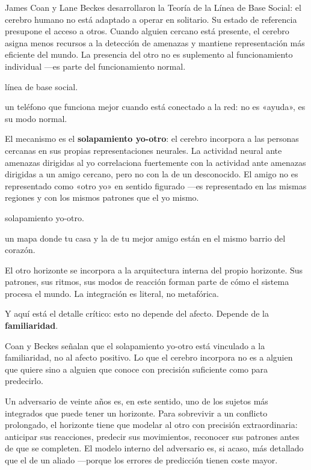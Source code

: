 \noindent James Coan y Lane Beckes desarrollaron la Teoría de la Línea de Base Social: el cerebro humano no está adaptado a operar en solitario. Su estado de referencia presupone el acceso a otros. Cuando alguien cercano está presente, el cerebro asigna menos recursos a la detección de amenazas y mantiene representación más eficiente del mundo. La presencia del otro no es suplemento al funcionamiento individual —es parte del funcionamiento normal.

\begin{fisica}
 línea de base social.

 un teléfono que funciona mejor cuando está conectado a la red: no es «ayuda», es su modo normal.
\end{fisica}
El mecanismo es el \textbf{solapamiento yo-otro}: el cerebro incorpora a las personas cercanas en sus propias representaciones neurales. La actividad neural ante amenazas dirigidas al yo correlaciona fuertemente con la actividad ante amenazas dirigidas a un amigo cercano, pero no con la de un desconocido. El amigo no es representado como «otro yo» en sentido figurado —es representado en las mismas regiones y con los mismos patrones que el yo mismo.

\begin{fisica}
 solapamiento yo-otro.

 un mapa donde tu casa y la de tu mejor amigo están en el mismo barrio del corazón.
\end{fisica}
El otro horizonte se incorpora a la arquitectura interna del propio horizonte. Sus patrones, sus ritmos, sus modos de reacción forman parte de cómo el sistema procesa el mundo. La integración es literal, no metafórica.

Y aquí está el detalle crítico: esto no depende del afecto. Depende de la \textbf{familiaridad}.

\noindent Coan y Beckes señalan que el solapamiento yo-otro está vinculado a la familiaridad, no al afecto positivo. Lo que el cerebro incorpora no es a alguien que quiere sino a alguien que conoce con precisión suficiente como para predecirlo.

Un adversario de veinte años es, en este sentido, uno de los sujetos más integrados que puede tener un horizonte. Para sobrevivir a un conflicto prolongado, el horizonte tiene que modelar al otro con precisión extraordinaria: anticipar sus reacciones, predecir sus movimientos, reconocer sus patrones antes de que se completen. El modelo interno del adversario es, si acaso, más detallado que el de un aliado —porque los errores de predicción tienen coste mayor.

